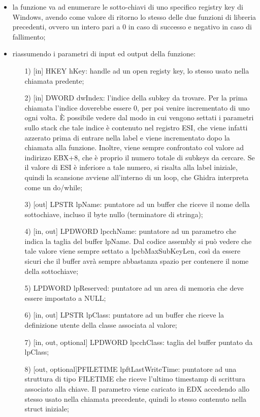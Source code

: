 \documentclass[12pt]{extarticle}
\begin{document}
\begin{itemize}
\item la funzione va ad enumerare le sotto-chiavi di uno specifico registry key di Windows, avendo come valore di ritorno lo stesso delle due funzioni di libreria precedenti, ovvero un intero pari a 0 in caso di successo e negativo in caso di fallimento;
\item riassumendo i parametri di input ed output della funzione:
\begin{itemize}
\item[1)] [in] \textsf{HKEY hKey}: handle ad un open registy key, lo stesso usato nella chiamata predente;
\item[2)] [in] \textsf{DWORD dwIndex}: l'indice della subkey da trovare. Per la prima chiamata l'indice doverebbe essere 0, per poi venire incrementato di uno ogni volta. È possibile vedere dal modo in cui vengono settati i parametri sullo stack che tale indice è contenuto nel registro ESI, che viene infatti azzerato prima di entrare nella label e viene incrementato dopo la chiamata alla funzione. Inoltre, viene sempre confrontato col valore ad indirizzo EBX+8, che è proprio il numero totale di subkeys da cercare. Se il valore di ESI è inferiore a tale numero, si risalta alla label iniziale, quindi la scansione avviene all'interno di un loop, che Ghidra interpreta come un do/while;
\item[3)] [out] \textsf{LPSTR lpName}: puntatore ad un buffer che riceve il nome della sottochiave, incluso il byte nullo (terminatore di stringa);
\item[4)] [in, out] \textsf{LPDWORD lpcchName}: puntatore ad un parametro che indica la taglia del buffer \textsf{lpName}. Dal codice assembly si può vedere che tale valore viene sempre settato a \textsf{lpcbMaxSubKeyLen}, così da essere sicuri che il buffer avrà sempre abbastanza spazio per contenere il nome della sottochiave;
\item[5)] \textsf{LPDWORD lpReserved}: puntatore ad un area di memoria che deve essere impostato a NULL;
\item[6)] [in, out] \textsf{LPSTR lpClass}: puntatore ad un buffer che riceve la definizione utente della classe associata al valore;
\item[7)] [in, out, optional] \textsf{LPDWORD lpcchClass}: taglia del buffer puntato da \textsf{lpClass};
\item[8)] [out, optional]\textsf{PFILETIME lpftLastWriteTime}: puntatore ad una struttura di tipo FILETIME che riceve l'ultimo timestamp di scrittura associato alla chiave. Il parametro viene caricato in EDX accedendo allo stesso usato nella chiamata precedente, quindi lo stesso contenuto nella struct iniziale;
\end{itemize}
\end{itemize}
\end{document}
